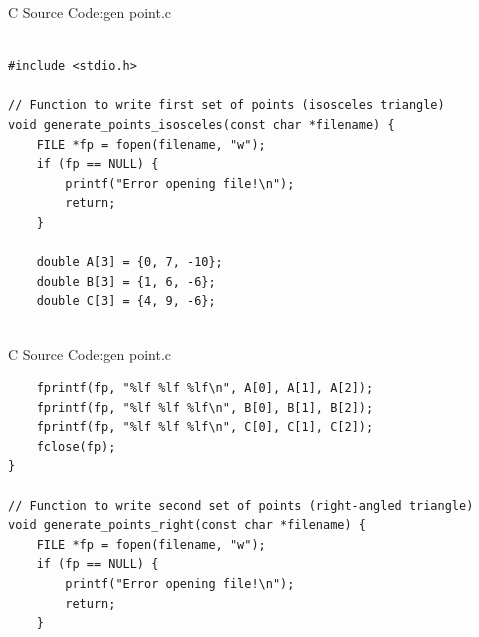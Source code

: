 \documentclass{beamer}
\numberwithin{equation}{section}
\theoremstyle{remark}
\begin{document}
\begin{frame}[fragile]{C Source Code:gen point.c}
\begin{verbatim}

#include <stdio.h>

// Function to write first set of points (isosceles triangle)
void generate_points_isosceles(const char *filename) {
    FILE *fp = fopen(filename, "w");
    if (fp == NULL) {
        printf("Error opening file!\n");
        return;
    }

    double A[3] = {0, 7, -10};
    double B[3] = {1, 6, -6};
    double C[3] = {4, 9, -6};
   
\end{verbatim}
\end{frame}
\begin{frame}[fragile]{C Source Code:gen point.c}
\begin{verbatim}
    fprintf(fp, "%lf %lf %lf\n", A[0], A[1], A[2]);
    fprintf(fp, "%lf %lf %lf\n", B[0], B[1], B[2]);
    fprintf(fp, "%lf %lf %lf\n", C[0], C[1], C[2]);
    fclose(fp);
}

// Function to write second set of points (right-angled triangle)
void generate_points_right(const char *filename) {
    FILE *fp = fopen(filename, "w");
    if (fp == NULL) {
        printf("Error opening file!\n");
        return;
    }

\end{verbatim}
\end{frame}
\end{document}
